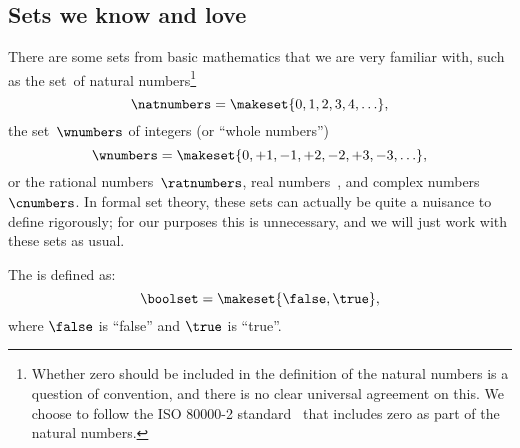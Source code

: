 \subsection{Sets we know and love}
\label{sec:natnumbers}
\label{sec:wnumbers}
\label{sec:ratnumbers}
\label{sec:reals}

There are some sets from basic mathematics that we are very familiar with, such as
the set~\natnumbers  of natural numbers\footnote{
    Whether zero should be included in the definition of the natural numbers is a question of convention, and there is no clear universal agreement on this.
    We choose to follow the ISO 80000-2 standard~\cite{ISO:2009:IQU} that includes zero as part of the natural numbers.
}
%
\begin{equation}
    \natnumbers = \makeset{0, 1, 2, 3, 4, \ldots },
\end{equation}
%
the set~$\wnumbers$ of integers (or ``whole numbers'')
\begin{equation}
    \wnumbers = \makeset{ 0, +1, -1, +2, -2, +3, -3, \ldots},
\end{equation}
%
or the rational numbers~$\ratnumbers$, real numbers~\reals, and complex numbers $\cnumbers$.
In formal set theory, these sets can actually be quite a nuisance to define rigorously; for our purposes this is unnecessary, and we will just work with these sets as usual.

\label{sec:booleans}
The  is defined as:
\begin{equation}
    \boolset = \makeset{ \false, \true },
\end{equation}
where $\false$ is ``false'' and $\true$ is ``true''.
